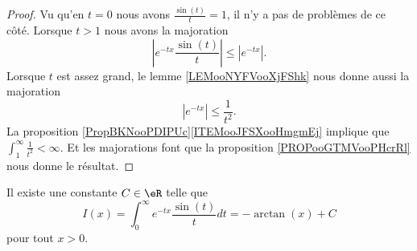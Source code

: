 \begin{proof}
	Vu qu'en \( t=0\) nous avons \( \frac{ \sin(t) }{ t }=1\), il n'y a pas de problèmes de ce côté. Lorsque \( t>1\) nous avons la majoration
	\begin{equation}
		|  e^{-tx}\frac{ \sin(t) }{ t } |\leq |  e^{-tx} |.
	\end{equation}
	Lorsque \( t\) est assez grand, le lemme \ref{LEMooNYFVooXjFShk} nous donne aussi la majoration
	\begin{equation}
		|  e^{-tx} |\leq \frac{1}{ t^2 }.
	\end{equation}
	La proposition \ref{PropBKNooPDIPUc}\ref{ITEMooJFSXooHmgmEj} implique que \( \int_1^{\infty}\frac{1}{ t^2 }<\infty\). Et les majorations font que la proposition \ref{PROPooGTMVooPHcrRl} nous donne le résultat.
\end{proof}

\begin{lemma}     \label{LEMooRDCSooBrWmep}
	Il existe une constante \( C\in \eR\) telle que
	\begin{equation}
		I(x)=\int_0^{\infty} e^{-tx}\frac{ \sin(t) }{ t }dt=-\arctan(x)+C
	\end{equation}
	pour tout \( x>0\).
\end{lemma}

